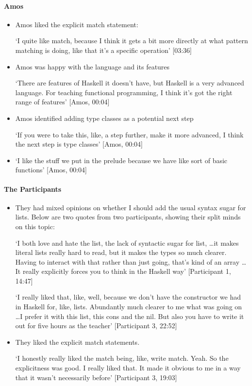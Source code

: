\paragraph{Amos}
\begin{itemize}

    \item Amos liked the explicit match statement:
    
    `I quite like match, because I think it gets a bit more directly at what pattern matching is doing, like that it's a specific operation' [03:36]

    \item Amos was happy with the language and its features
    
    `There are features of Haskell it doesn't have, but Haskell is a very advanced language. For teaching functional programming, I think it's got the right range of features' [Amos, 00:04]

    \item Amos identified adding type classes as a potential next step 
    
    `If you were to take this, like, a step further, make it more advanced, I think the next step is type
    classes' [Amos, 00:04]
    
    \item `I like the stuff we put in the prelude because we have like sort of basic functions' [Amos, 00:04]
    
    
\end{itemize}

\paragraph{The Participants}\begin{itemize}
    \item They had mixed opinions on whether I should add the usual syntax sugar for lists. Below are two quotes from two participants, showing their split minds on this topic:
    
    `I both love and hate the list, the lack of syntactic sugar for list, \ldots it makes literal lists really hard to read, but it makes the types so much clearer. Having to interact with that rather than just going, that's kind of an array \ldots It really explicitly forces you to think in the Haskell
    way' [Participant 1, 14:47]
    
    `I really liked that, like, well, because we don't have the constructor we had in Haskell
    for, like, lists. Abundantly much clearer to me what was going on \ldots I prefer it with this list, this cons and the nil. But also you have to write it out for five hours as the teacher' [Participant 3, 22:52]

    \item They liked the explicit match statements. 
    
    `I honestly really liked the match being, like, write match. Yeah. So the
    explicitness was good. I really liked that. It made it obvious to me in a way that it wasn't
    necessarily before' [Participant 3, 19:03]
\end{itemize}

